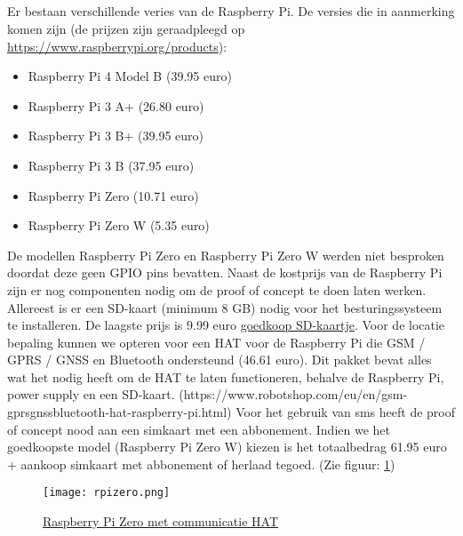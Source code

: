 \subsection{}
Er bestaan verschillende veries van de Raspberry Pi. De versies die in aanmerking komen zijn (de prijzen zijn geraadpleegd op \url{https://www.raspberrypi.org/products}):
\begin{itemize}
    \item Raspberry Pi 4 Model B (39.95 euro)
    \item Raspberry Pi 3 A+ (26.80 euro)
    \item Raspberry Pi 3 B+ (39.95 euro)
    \item Raspberry Pi 3 B (37.95 euro)
    \item Raspberry Pi Zero (10.71 euro)
    \item Raspberry Pi Zero W (5.35 euro)
\end{itemize}
De modellen Raspberry Pi Zero en Raspberry Pi Zero W werden niet besproken doordat deze geen GPIO pins bevatten. 
\newline
Naast de kostprijs van de Raspberry Pi zijn er nog componenten nodig om de proof of concept te doen laten werken. 
Allereest is er een SD-kaart (minimum 8 GB) nodig voor het besturingssysteem te installeren. De laagste prijs is 9.99 euro \href{https://www.bol.com/nl/p/philips-sd-kaart-8gb-sd-card-class-4/9200000023935849/?country=BE&Referrer=ADVNLPPcefd2c00d536683c00927aff17000051123&utm_source=51123&utm_medium=Affiliates&utm_campaign=CPS&utm_content=txl}{goedkoop SD-kaartje}.
\newline
Voor de locatie bepaling kunnen we opteren voor een HAT voor de Raspberry Pi die GSM / GPRS / GNSS en Bluetooth ondersteund (46.61 euro). Dit pakket bevat alles wat het nodig heeft om de HAT te laten functioneren, behalve de Raspberry Pi, power supply en een SD-kaart. (https://www.robotshop.com/eu/en/gsm-gprsgnssbluetooth-hat-raspberry-pi.html)
\newline
Voor het gebruik van sms heeft de proof of concept nood aan een simkaart met een abbonement.
\newline
Indien we het goedkoopste model (Raspberry Pi Zero W) kiezen is het totaalbedrag 61.95 euro + aankoop simkaart met abbonement of herlaad tegoed. (Zie figuur: \ref{fig:rpi})
\begin{figure}
    \texttt{[image: rpizero.png]}
    \caption{\href{https://www.sossolutions.nl/waveshare-gsm-gprs-gnss-bluetooth-hat-voor-raspberry-pi?gclid=Cj0KCQiA1-3yBRCmARIsAN7B4H3Z9w0Z11t4JCm9ggLyzhnV-yiRS6dDgZtefIcETuYflOTaskne-ywaAkLnEALw_wcB}{Raspberry Pi Zero met communicatie HAT}}
    \label{fig:rpi}
\end{figure}
